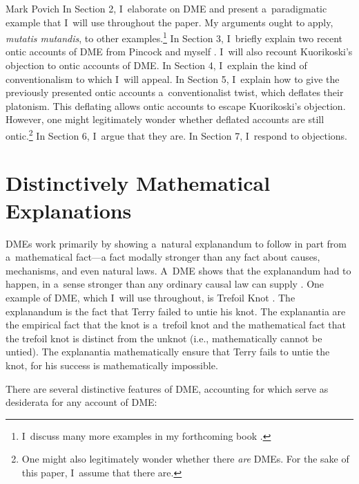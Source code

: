 \begin{artengenv}{Mark Povich}
In Section 2, I~elaborate on DME and present a~paradigmatic example that I~will use throughout the paper. My arguments ought to apply, \textit{mutatis mutandis}, to other examples.\footnote{I~discuss many more examples in my forthcoming book
\parencite[][]{povich_rules_2024}.%
} In Section 3, I~briefly explain two recent ontic accounts of DME from Pincock 
\parencite*[][]{pincock_abstract_2015} %
 and myself 
\parencite[][]{craver_constitutive_2021}. %
 I~will also recount Kuorikoski's 
\parencite*[][]{priest_note_2021} %
 objection to ontic accounts of DME. In Section 4, I~explain the kind of conventionalism to which I~will appeal. In Section 5, I~explain how to give the previously presented ontic accounts a~conventionalist twist, which deflates their platonism. This deflating allows ontic accounts to escape Kuorikoski's objection. However, one might legitimately wonder whether deflated accounts are still ontic.\footnote{One might also legitimately wonder whether there \textit{are} DMEs. For the sake of this paper, I~assume that there are.} In Section 6, I~argue that they are. In Section 7, I~respond to objections.

\section{Distinctively Mathematical Explanations}
DMEs work primarily by showing a~natural explanandum to follow in part from a~mathematical fact---a fact modally stronger than any fact about causes, mechanisms, and even natural laws. A~DME shows that the explanandum had to happen, in a~sense stronger than any ordinary causal law can supply
\parencite[][]{lange_what_2013}. %
 One example of DME, which I~will use throughout, is Trefoil Knot 
\parencite[][]{lange_what_2013}. %
 The explanandum is the fact that Terry failed to untie his knot. The explanantia are the empirical fact that the knot is a~trefoil knot and the mathematical fact that the trefoil knot is distinct from the unknot (i.e., mathematically cannot be untied). The explanantia mathematically ensure that Terry fails to untie the knot, for his success is mathematically impossible.

There are several distinctive features of DME, accounting for which serve as desiderata for any account of DME:


\end{artengenv}
